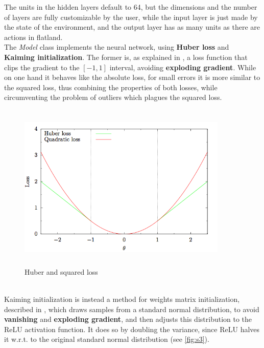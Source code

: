 \noindent 
The units in the hidden layers default to 64, but the dimensions and the number of layers are fully customizable by the user, while the input layer is just made by the state of the environment, and the output layer has as many units as there are actions in flatland. \\ The \textit{Model} class implements the neural network, using \textbf{Huber loss} and \textbf{Kaiming initialization}. The former is, as explained in \cite{huber}, a loss function that clips the gradient to the $[-1,1]$ interval, avoiding \textbf{exploding gradient}. While on one hand it behaves like the absolute loss, for small errors it is more similar to the squared loss, thus combining the properties of both losses, while circumventing the problem of outliers which plagues the squared loss.\\
\begin{figure}[H] 
\includegraphics[height=80mm, width=100mm, scale=0.5]{chapters/huber.png}
\centering
\caption{Huber and squared loss}
\label{fig:s2} 
\end{figure}
\noindent
 \\ Kaiming initialization is instead a method for weights matrix initialization, described in \cite{kaiming}, which draws samples from a standard normal distribution, to avoid \textbf{vanishing} and \textbf{exploding gradient}, and then adjusts this distribution to the ReLU activation function. It does so by doubling the variance, since ReLU halves it w.r.t. to the original standard normal distribution (see \ref{fig:s3}).
 
